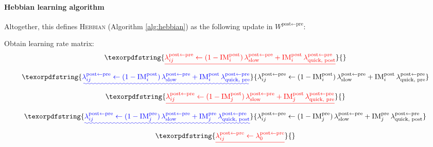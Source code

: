 \documentclass{article}
\providecommand{\DIFaddtex}[1]{{\protect\color{blue}\uwave{#1}}} %
\providecommand{\DIFdeltex}[1]{{\protect\color{red}\sout{#1}}}                      %
\providecommand{\DIFaddbegin}{} %
\providecommand{\DIFaddend}{} %
\providecommand{\DIFdelbegin}{} %
\providecommand{\DIFdelend}{} %
\providecommand{\DIFadd}[1]{\texorpdfstring{\DIFaddtex{#1}}{#1}} %
\providecommand{\DIFdel}[1]{\texorpdfstring{\DIFdeltex{#1}}{}} %
\begin{document}
\paragraph*{Hebbian learning algorithm}
Altogether, this defines \textsc{Hebbian} (Algorithm \ref{alg:hebbian}) as the following update in $W^{\textrm{post} \leftarrow \textrm{pre}}$:
\begin{algorithm}
\caption[]{Hebbian Learning}\label{alg:hebbian}
\begin{algorithmic}[1]
\DIFdelbegin %
\DIFdelend \DIFaddbegin {}
    \DIFaddend \State Obtain learning rate matrix:
    \DIFaddbegin {}
        \State \Return
    \EndIf
    \DIFaddend {}
        \DIFdelbegin \[
            \DIFdel{\lambda_{ij}^{\textrm{post} \leftarrow \textrm{pre}}
            \gets
            (1-\textrm{IM}^\textrm{post}_i)\,\lambda^{\textrm{post} \leftarrow \textrm{pre}}_\textrm{slow}
            + \textrm{IM}^\textrm{post}_i\,\lambda^{\textrm{post}\leftarrow\textrm{pre}}_{\textrm{quick, post}}
        }\]%
\DIFdelend \DIFaddbegin \[
            \DIFadd{\lambda_{ij}^{\textrm{post} \leftarrow \textrm{pre}}
            \gets
            (1-\textrm{IM}^\textrm{post}_i)\,\lambda^{\textrm{post} \leftarrow \textrm{pre}}_\textrm{slow}
            + \textrm{IM}^\textrm{post}_i\,\lambda^{\textrm{post}\leftarrow\textrm{pre}}_{\textrm{quick, pre}}
        }\]\DIFaddend 
        \DIFdelbegin \[
            \DIFdel{\lambda_{ij}^{\textrm{post} \leftarrow \textrm{pre}}
            \gets
            (1-\textrm{IM}^\textrm{post}_j)\,\lambda^{\textrm{post} \leftarrow \textrm{pre}}_\textrm{slow}
            + \textrm{IM}^\textrm{post}_j\,\lambda^{\textrm{post}\leftarrow\textrm{pre}}_{\textrm{quick, pre}}
        }\]%
\DIFdelend \DIFaddbegin \[
            \DIFadd{\lambda_{ij}^{\textrm{post} \leftarrow \textrm{pre}}
            \gets
            (1-\textrm{IM}^\textrm{pre}_j)\,\lambda^{\textrm{post} \leftarrow \textrm{pre}}_\textrm{slow}
            + \textrm{IM}^\textrm{pre}_j\,\lambda^{\textrm{post}\leftarrow\textrm{pre}}_{\textrm{quick, post}}
        }\]\DIFaddend 
    \Else
        \DIFdelbegin \[
            \DIFdel{\lambda_{ij}^{\textrm{post} \leftarrow \textrm{pre}} 
            \gets 
            \lambda^{\textrm{post}\leftarrow\textrm{pre}}_0
        }\]%
\DIFdelend \DIFaddbegin \[
\]
\end{algorithmic}
\end{algorithm}
\end{document}

